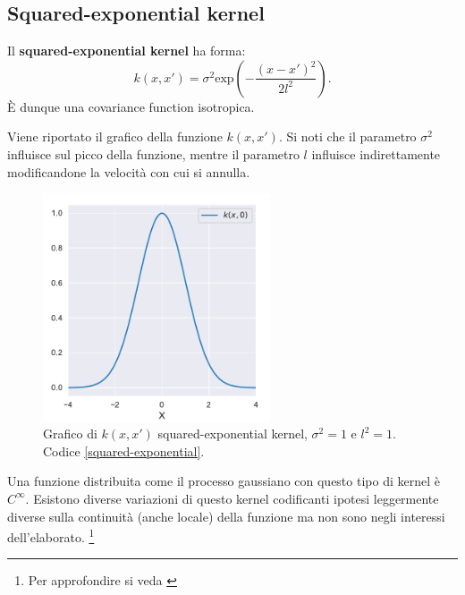 \subsection{Squared-exponential kernel}


\begin{defi}
Il \textbf{squared-exponential kernel} ha forma:
\[
k(x,x')=\sigma^2 \text{exp}\left( -\frac{(x-x')^2}{2l^2} \right).
\]
È dunque una covariance function isotropica.
\end{defi}

Viene riportato il grafico della funzione $k(x,x')$. Si noti che il parametro $\sigma^2$ influisce sul picco della funzione, mentre il parametro $l$ influisce indirettamente  modificandone la velocità con cui si annulla.



\begin{figure}[h]
    \centering
    \includegraphics[width=0.6\textwidth]{images/Gaussian process/Squared-exponential kernel.pdf}
    \caption{Grafico di $k(x,x')$ squared-exponential kernel, $\sigma^2=1$ e $l^2=1$. Codice \ref{squared-exponential}.}
    \label{squared-exponential kernel}
\end{figure}

\newpage

Una funzione distribuita come il processo gaussiano con questo tipo di kernel è $C^\infty$. Esistono diverse variazioni di questo kernel codificanti ipotesi leggermente diverse
sulla continuità (anche locale) della funzione ma non sono negli interessi dell'elaborato. \footnote{Per approfondire si veda \cite{duvenaud_automatic_2014}}
\vspace{0.5cm}\\

